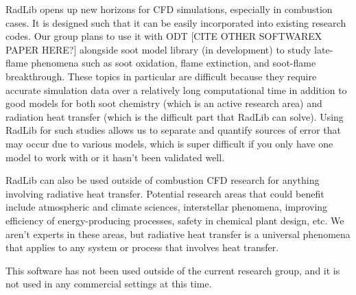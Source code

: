 \documentclass[preprint,12pt, a4paper]{elsarticle}
\begin{document}
RadLib opens up new horizons for CFD simulations, especially in combustion cases. It is designed such that it can be easily incorporated into existing research codes. Our group plans to use it with ODT [CITE OTHER SOFTWAREX PAPER HERE?] alongside soot model library (in development) to study late-flame phenomena such as soot oxidation, flame extinction, and soot-flame breakthrough. These topics in particular are difficult because they require accurate simulation data over a relatively long computational time in addition to good models for both soot chemistry (which is an active research area) and radiation heat transfer (which is the difficult part that RadLib can solve). Using RadLib for such studies allows us to separate and quantify sources of error that may occur due to various models, which is super difficult if you only have one model to work with or it hasn't been validated well. 

RadLib can also be used outside of combustion CFD research for anything involving radiative heat transfer. Potential research areas that could benefit include atmospheric and climate sciences, interstellar phenomena, improving efficiency of energy-producing processes, safety in chemical plant design, etc. We aren't experts in these areas, but radiative heat transfer is a universal phenomena that applies to any system or process that involves heat transfer. 

This software has not been used outside of the current research group, and it is not used in any commercial settings at this time. 

\end{document}
